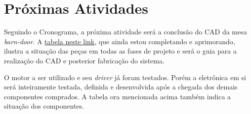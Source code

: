 \documentclass[a4paper, 12pt]{article}
\begin{document}
\section{Próximas Atividades}

Seguindo o Cronograma, a próxima atividade será a conclusão do CAD da mesa \textit{barn-door}. A \href{https://docs.google.com/spreadsheets/d/1AbPNhJbIAHxrgyp-HbyYSLwaWb71SL8_rIbzwGyOWhE/edit?usp=sharing}{tabela neste link}, que ainda estou completando e aprimorando,
ilustra a situação das peças em todas as fases de projeto e será o guia para a realização do CAD e posterior fabricação do sistema. 

O motor a ser utilizado e seu \textit{driver} já foram testados. Porém a eletrônica em si será inteiramente testada, definida e desenvolvida após a chegada dos demais componentes comprados. A tabela ora mencionada acima também indica a situação dos componentes. 
\end{document}
